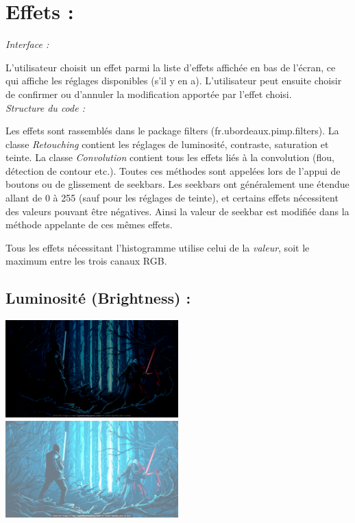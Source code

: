 \section{Effets :}
\emph{Interface :}

L'utilisateur choisit un effet parmi la liste d'effets affichée en bas de l'écran, ce qui affiche les 
réglages disponibles (s'il y en a). L'utilisateur peut ensuite choisir de confirmer ou d'annuler la modification
apportée par l'effet choisi.
\\

\emph{Structure du code :}

Les effets sont rassemblés dans le package filters (fr.ubordeaux.pimp.filters).
La classe \emph{Retouching} contient les réglages de luminosité, contraste, saturation et teinte.
La classe \emph{Convolution} contient tous les effets liés à la convolution (flou, détection de contour etc.).
Toutes ces méthodes sont appelées lors de l'appui de boutons ou de glissement de seekbars. Les seekbars ont généralement
une étendue allant de 0 à 255 (sauf pour les réglages de teinte), et certains effets nécessitent des valeurs pouvant être
négatives. Ainsi la valeur de seekbar est modifiée dans la méthode appelante de ces mêmes effets.

Tous les effets nécessitant l'histogramme utilise celui de la \emph{valeur}, soit le maximum entre les trois canaux RGB.

\subsection{Luminosité (Brightness) :}
\includegraphics[width=0.5\textwidth]{report_src/brightness_low.jpeg}
\includegraphics[width=0.5\textwidth]{report_src/brightness_high.jpeg}

